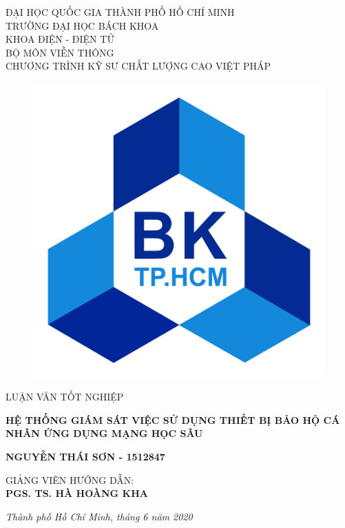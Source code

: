 \documentclass[12pt]{report}
\begin{document}
\begin{titlepage}
\centering
{\large ĐẠI HỌC QUỐC GIA THÀNH PHỐ HỒ CHÍ MINH\\}
{\large TRƯỜNG ĐẠI HỌC BÁCH KHOA\\}
{\large KHOA ĐIỆN - ĐIỆN TỬ\\}
{\large BỘ MÔN VIỄN THÔNG\\}
{\large CHƯƠNG TRÌNH KỸ SƯ CHẤT LƯỢNG CAO VIỆT PHÁP\\}

\begin{figure}[h]
  \centerline{\includegraphics[scale=0.1]{images/logo_bk.png}}
\end{figure}

\vspace{0.3cm}

{\Large LUẬN VĂN TỐT NGHIỆP}

\vspace{0.7cm}

{\LARGE\bfseries HỆ THỐNG GIÁM SÁT VIỆC SỬ DỤNG THIẾT BỊ BẢO HỘ CÁ NHÂN ỨNG DỤNG MẠNG HỌC SÂU}

\vspace{0.7cm}

{\large\bfseries NGUYỄN THÁI SƠN - 1512847}

\vspace{0.7cm}

{\large GIẢNG VIÊN HƯỚNG DẪN:\\}
{\large\bfseries PGS. TS. HÀ HOÀNG KHA}

\vfill

{\itshape Thành phố Hồ Chí Minh, tháng 6 năm 2020}
\end{titlepage}
\end{document}
